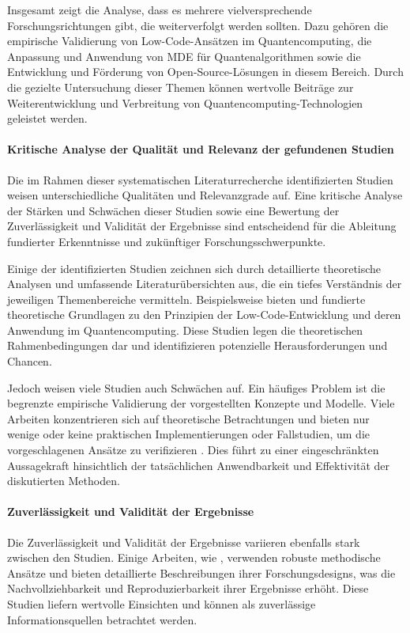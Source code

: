 Insgesamt zeigt die Analyse, dass es mehrere vielversprechende Forschungsrichtungen gibt, die weiterverfolgt werden sollten. 
Dazu gehören die empirische Validierung von Low-Code-Ansätzen im Quantencomputing, die Anpassung und Anwendung von MDE für 
Quantenalgorithmen sowie die Entwicklung und Förderung von Open-Source-Lösungen in diesem Bereich. Durch die gezielte 
Untersuchung dieser Themen können wertvolle Beiträge zur Weiterentwicklung und Verbreitung von Quantencomputing-Technologien geleistet werden.

\paragraph{Kritische Analyse der Qualität und Relevanz der gefundenen Studien}

Die im Rahmen dieser systematischen Literaturrecherche identifizierten Studien weisen unterschiedliche 
Qualitäten und Relevanzgrade auf. Eine kritische Analyse der Stärken und Schwächen dieser Studien sowie eine Bewertung 
der Zuverlässigkeit und Validität der Ergebnisse sind entscheidend für die Ableitung fundierter Erkenntnisse und zukünftiger Forschungsschwerpunkte.

Einige der identifizierten Studien zeichnen sich durch detaillierte theoretische Analysen und umfassende 
Literaturübersichten aus, die ein tiefes Verständnis der jeweiligen Themenbereiche vermitteln. 
Beispielsweise bieten \cite{Perez-Delgado_2020} und \cite{Gemeinhardt_2021} fundierte theoretische Grundlagen 
zu den Prinzipien der Low-Code-Entwicklung und deren Anwendung im Quantencomputing. Diese Studien legen die 
theoretischen Rahmenbedingungen dar und identifizieren potenzielle Herausforderungen und Chancen.

Jedoch weisen viele Studien auch Schwächen auf. Ein häufiges Problem ist die begrenzte empirische Validierung 
der vorgestellten Konzepte und Modelle. Viele Arbeiten konzentrieren sich auf theoretische Betrachtungen und 
bieten nur wenige oder keine praktischen Implementierungen oder Fallstudien, um die vorgeschlagenen Ansätze 
zu verifizieren \cite{Amato_2023}. Dies führt zu einer eingeschränkten Aussagekraft hinsichtlich der tatsächlichen 
Anwendbarkeit und Effektivität der diskutierten Methoden.

\paragraph{Zuverlässigkeit und Validität der Ergebnisse}
Die Zuverlässigkeit und Validität der Ergebnisse variieren ebenfalls stark zwischen den Studien. Einige 
Arbeiten, wie \cite{Ahmad_2023}, verwenden robuste methodische Ansätze und bieten detaillierte Beschreibungen 
ihrer Forschungsdesigns, was die Nachvollziehbarkeit und Reproduzierbarkeit ihrer Ergebnisse erhöht. Diese Studien 
liefern wertvolle Einsichten und können als zuverlässige Informationsquellen betrachtet werden.

